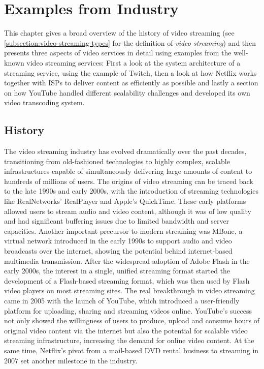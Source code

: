 \chapter{Examples from Industry}\label{chapter:examples}

This chapter gives a broad overview of the history of video streaming (see \autoref{subsection:video-streaming-types} for the definition of \textit{video streaming}) and then presents three aspects of video services in detail using examples from the well-known video streaming services: First a look at the system architecture of a streaming service, using the example of Twitch, then a look at how Netflix works together with \ac{ISPs} to deliver content as efficiently as possible and lastly a section on how YouTube handled different scalability challenges and developed its own video transcoding system.     

\section{History}
The video streaming industry has evolved dramatically over the past decades, transitioning from old-fashioned technologies to highly complex, scalable infrastructures capable of simultaneously delivering large amounts of content to hundreds of millions of users. The origins of video streaming can be traced back to the late 1990s and early 2000s, with the introduction of streaming technologies like RealNetworks' RealPlayer and Apple's QuickTime. These early platforms allowed users to stream audio and video content, although it was of low quality and had significant buffering issues due to limited bandwidth and server capacities.
Another important precursor to modern streaming was \ac{MBone}, a virtual network introduced in the early 1990s to support audio and video broadcasts over the internet, showing the potential behind internet-based multimedia transmission. 
After the widespread adoption of Adobe Flash in the early 2000s, the interest in a single, unified streaming format started the development of a Flash-based streaming format, which was then used by Flash video players on most streaming sites.
The real breakthrough in video streaming came in 2005 with the launch of YouTube, which introduced a user-friendly platform for uploading, sharing and streaming videos online. YouTube's success not only showed the willingness of users to produce, upload and consume hours of original video content via the internet but also the potential for scalable video streaming infrastructure, increasing the demand for online video content. At the same time, Netflix's pivot from a mail-based DVD rental business to streaming in 2007 set another milestone in the industry. 

